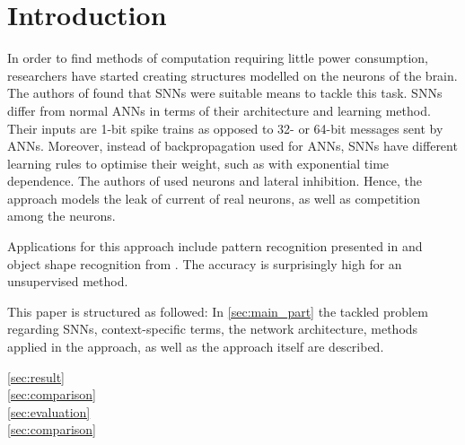 \section{Introduction}

In order to find methods of computation requiring little power consumption, researchers have started creating structures modelled on the neurons of the brain.
The authors of \cite{SNN} found that \acp{SNN} were suitable means to tackle this task.
\acp{SNN} differ from normal \acp{ANN} in terms of their architecture and learning method.
Their inputs are 1-bit spike trains as opposed to 32- or 64-bit messages sent by \acp{ANN}.
Moreover, instead of backpropagation used for \acp{ANN}, \acp{SNN} have different learning rules to optimise their weight, such as  with exponential time dependence.
The authors of \cite{SNN} used  neurons and lateral inhibition.
Hence, the approach models the leak of current of real neurons, as well as competition among the neurons.

Applications for this approach include pattern recognition presented in \cite{SNN} and object shape recognition from \cite{object_detection_SNN}.
The accuracy is surprisingly high for an unsupervised method.

This paper is structured as followed:
In \autoref{sec:main_part} the tackled problem regarding \acp{SNN}, context-specific terms, the network architecture, methods applied in the approach, as well as the approach itself are described.

\textcolor{red}{\autoref{sec:result}\\
\autoref{sec:comparison}\\
\autoref{sec:evaluation}\\
\autoref{sec:comparison}}